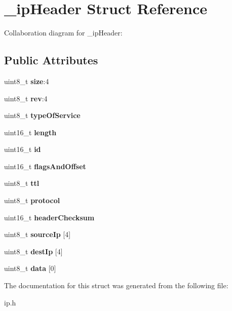 \hypertarget{struct__ipHeader}{}\section{\+\_\+ip\+Header Struct Reference}
\label{struct__ipHeader}


Collaboration diagram for \+\_\+ip\+Header\+:
\subsection*{Public Attributes}
\begin{DoxyCompactItemize}
\item 
\mbox{\label{struct__ipHeader_a73d0b3ca182782ffdf4185695e542bed}} 
uint8\+\_\+t {\bfseries size}\+:4
\item 
\mbox{\label{struct__ipHeader_a78817fe0f8a50b109a2d363908aacd7e}} 
uint8\+\_\+t {\bfseries rev}\+:4
\item 
\mbox{\label{struct__ipHeader_ad05cb0a46178ce1e2ad5bd70477bcab0}} 
uint8\+\_\+t {\bfseries type\+Of\+Service}
\item 
\mbox{\label{struct__ipHeader_aa57d8aded3d774453b430c48b537037b}} 
uint16\+\_\+t {\bfseries length}
\item 
\mbox{\label{struct__ipHeader_a7d8dea2d6d12f6a9df6aa7351eb0f51e}} 
uint16\+\_\+t {\bfseries id}
\item 
\mbox{\label{struct__ipHeader_a4acedf015fa0b20895027c41579fd969}} 
uint16\+\_\+t {\bfseries flags\+And\+Offset}
\item 
\mbox{\label{struct__ipHeader_ab8b31781ffe4bba98f9d7441cde7a430}} 
uint8\+\_\+t {\bfseries ttl}
\item 
\mbox{\label{struct__ipHeader_a2fd883d2f1fae6b284bffe605c7c0191}} 
uint8\+\_\+t {\bfseries protocol}
\item 
\mbox{\label{struct__ipHeader_a188591a18d300fa918419b432732e875}} 
uint16\+\_\+t {\bfseries header\+Checksum}
\item 
\mbox{\label{struct__ipHeader_acb7602cdc4168dbc81785c9d8ad4b8d0}} 
uint8\+\_\+t {\bfseries source\+Ip} \mbox{[}4\mbox{]}
\item 
\mbox{\label{struct__ipHeader_a6bb2871daa56f2608e2ef62866fce3d4}} 
uint8\+\_\+t {\bfseries dest\+Ip} \mbox{[}4\mbox{]}
\item 
\mbox{\label{struct__ipHeader_a97ae9e02145ea5df5a2fe2afdf8955b6}} 
uint8\+\_\+t {\bfseries data} \mbox{[}0\mbox{]}
\end{DoxyCompactItemize}


The documentation for this struct was generated from the following file\+:\begin{DoxyCompactItemize}
\item 
ip.\+h\end{DoxyCompactItemize}
